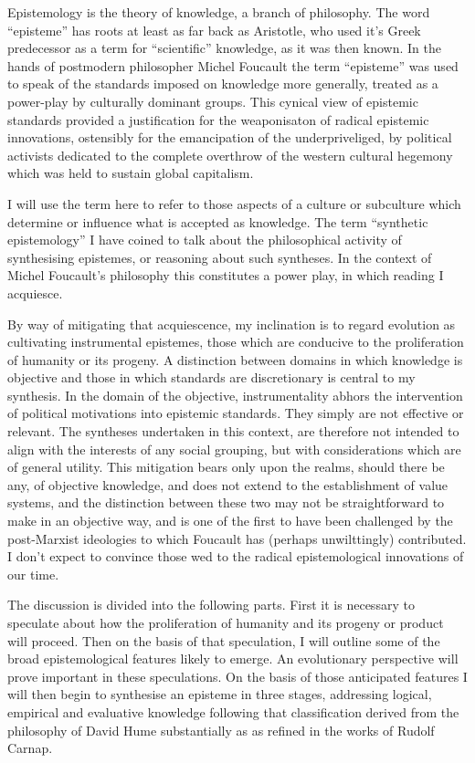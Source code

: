 \documentclass[10pt,titlepage]{article}
\begin{document}
Epistemology is the theory of knowledge, a branch of philosophy.
The word ``episteme'' has roots at least as far back as Aristotle, who used it's Greek predecessor as a term for ``scientific'' knowledge, as it was then known.
In the hands of postmodern philosopher Michel Foucault the term ``episteme'' was used to speak of the standards imposed on knowledge more generally, treated as a power-play by culturally dominant groups.
This cynical view of epistemic standards provided a justification for the weaponisaton of radical epistemic innovations, ostensibly for the emancipation of the underpriveliged, by political activists dedicated to the complete overthrow of the western cultural hegemony which was held to sustain global capitalism.

I will use the term here to refer to those aspects of a culture or subculture which determine or influence what is accepted as knowledge.
The term ``synthetic epistemology'' I have coined to talk about the philosophical activity of synthesising epistemes, or reasoning about such syntheses.
In the context of Michel Foucault's philosophy this constitutes a power play, in which reading I acquiesce.

By way of mitigating that acquiescence, my inclination is to regard evolution as cultivating instrumental epistemes, those which are conducive to the proliferation of humanity or its progeny.
A distinction between domains in which knowledge is objective and those in which standards are discretionary is central to my synthesis.
In the domain of the objective, instrumentality abhors the intervention of political motivations into epistemic standards.
They simply are not effective or relevant.
The syntheses undertaken in this context, are therefore not intended to align with the interests of any social grouping, but with considerations which are of general utility.
This mitigation bears only upon the realms, should there be any, of objective knowledge, and does not extend to the establishment of value systems, and the distinction between these two may not be straightforward to make in an objective way, and is one of the first to have been challenged by the post-Marxist ideologies to which Foucault has (perhaps unwilttingly) contributed.
I don't expect to convince those wed to the radical epistemological innovations of our time.

The discussion is divided into the following parts.
First it is necessary to speculate about how the proliferation of humanity and its progeny or product will proceed.
Then on the basis of that speculation, I will outline some of the broad epistemological features likely to emerge.
An evolutionary perspective will prove important in these speculations.
On the basis of those anticipated features I will then begin to synthesise an episteme in three stages, addressing logical, empirical and evaluative knowledge following that classification derived from the philosophy of David Hume substantially as as refined in the works of Rudolf Carnap.
\end{document}
